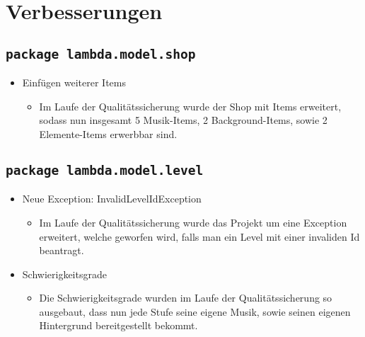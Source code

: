 \section{Verbesserungen}
\subsection{\texttt{package lambda.model.shop}}
\begin{itemize}
\item Einfügen weiterer Items
\begin{itemize} 
\item Im Laufe der Qualitätssicherung wurde der Shop mit Items erweitert, sodass nun insgesamt 5 Musik-Items, 2 Background-Items, sowie 2 Elemente-Items erwerbbar sind.
	\end{itemize}
\end{itemize}

\subsection{\texttt{package lambda.model.level}}
\begin{itemize}
\item Neue Exception: InvalidLevelIdException
\begin{itemize} 
\item Im Laufe der Qualitätssicherung wurde das Projekt um eine Exception erweitert, welche geworfen wird, falls man ein Level mit einer invaliden Id beantragt.
	\end{itemize}
\end{itemize}

\begin{itemize}
\item Schwierigkeitsgrade
\begin{itemize} 
\item Die Schwierigkeitsgrade wurden im Laufe der Qualitätssicherung so ausgebaut, dass nun jede Stufe seine eigene Musik, sowie seinen eigenen Hintergrund bereitgestellt bekommt.
	\end{itemize}
\end{itemize}